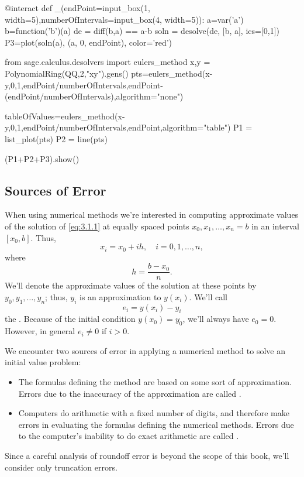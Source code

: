 \documentclass{ximera}
\begin{document}
\begin{sageCell}%
@interact
def _(endPoint=input_box(1, width=5),numberOfIntervals=input_box(4, width=5)):
    a=var('a')
    b=function('b')(a)
    de = diff(b,a) ==  a-b
    soln = desolve(de, [b, a], ics=[0,1])
    P3=plot(soln(a), (a, 0, endPoint), color='red')

    from sage.calculus.desolvers import eulers_method
    x,y = PolynomialRing(QQ,2,"xy").gens()
    pts=eulers_method(x-y,0,1,endPoint/numberOfIntervals,endPoint-(endPoint/numberOfIntervals),algorithm="none")
   
    tableOfValues=eulers_method(x-y,0,1,endPoint/numberOfIntervals,endPoint,algorithm="table")
    P1 = list_plot(pts)
    P2 = line(pts)

    (P1+P2+P3).show()
\end{sageCell}
 

 
 
\subsection*{Sources of Error}
 
When using numerical methods we're interested in
computing approximate values of the solution of \eqref{eq:3.1.1} at
equally spaced points $x_0, x_1, \ldots, x_n=b$ in an interval
$[x_0,b]$.
 Thus,
$$
x_i=x_0+ih,\quad i=0,1, \dots,n,
$$
where
$$
h=\frac{b-x_0}{n}.
$$
We'll denote the approximate values of the solution at these points
by $y_0, y_1, \ldots, y_n$;   thus, $y_i$ is an approximation to
$y(x_i)$.
We'll call
$$
e_i=y(x_i)-y_i
$$
the . Because of the initial
condition
$y(x_0)=y_0$, we'll always have $e_0=0$. However, in general
$e_i\neq 0$ if $i>0$.
 
We encounter two sources of error
in applying a numerical method to solve an initial value problem:
\begin{itemize}
\item
The formulas defining the method are based on some sort of
approximation. Errors due to the inaccuracy of the approximation are
called .
\item
Computers do arithmetic with a fixed number of digits, and therefore
make errors in evaluating the formulas defining the numerical methods.
Errors due to the computer's inability to do exact arithmetic are
called .
\end{itemize}
 
Since a careful analysis of roundoff error is beyond the scope of this
book, we'll consider only truncation errors.
 
\end{document}
